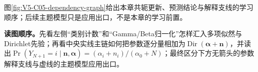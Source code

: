 \documentclass[UTF8,a4paper,11pt,openany]{ctexbook}
\begin{document}
\setcounter{page}{685}
\setcounter{chapter}{34}
\setcounter{figure}{0}
\pagestyle{headings}
图\ref{fig:V5-C05-dependency-graph}给出本章共轭更新、预测结论与解释支线的学习顺序；后续主题模型只是应用出口，不是本章的学习前置。

\FloatBarrier
\noindent\textbf{读图顺序。}先看左侧“类别计数”和“Gamma/Beta归一化”怎样汇入多项似然与Dirichlet先验；再看中央实线主链如何把参数逐分量相加为$\operatorname{Dir}(\boldsymbol\alpha+\boldsymbol n)$，并读出$\Pr(Y_{N+1}=i\mid\boldsymbol n,\boldsymbol\alpha)=(\alpha_i+n_i)/(\alpha_0+N)$；最终区分下方无箭头的参数解释支线与虚线的主题模型应用出口。
\end{document}
